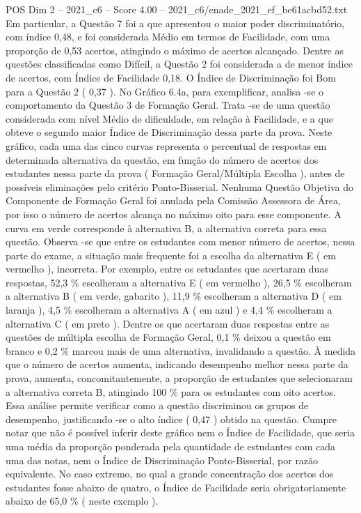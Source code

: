 \begin{textsample}{POS Dim 2 – 2021\_c6 – Score 4.00 – 2021\_c6/enade\_2021\_ef\_be61acbd52.txt}
Em particular, a Questão 7 foi a que apresentou o maior poder discriminatório, com índice 0,48, e foi considerada Médio em termos de Facilidade, com uma proporção de 0,53 acertos, atingindo o máximo de acertos alcançado.
Dentre as questões classificadas como Difícil, a Questão 2 foi considerada a de menor índice de acertos, com Índice de Facilidade 0,18.
O Índice de Discriminação foi Bom para a Questão 2 ( 0,37 ).
No Gráfico 6.4a, para exemplificar, analisa -se o comportamento da Questão 3 de Formação Geral.
Trata -se de uma questão considerada com nível Médio de dificuldade, em relação à Facilidade, e a que obteve o segundo maior Índice de Discriminação dessa parte da prova.
Neste gráfico, cada uma das cinco curvas representa o percentual de respostas em determinada alternativa da questão, em função do número de acertos dos estudantes nessa parte da prova ( Formação Geral/Múltipla Escolha ), antes de possíveis eliminações pelo critério Ponto-Bisserial.
Nenhuma Questão Objetiva do Componente de Formação Geral foi anulada pela Comissão Assessora de Área, por isso o número de acertos alcança no máximo oito para esse componente.
A curva em verde corresponde à alternativa B, a alternativa correta para essa questão.
Observa -se que entre os estudantes com menor número de acertos, nessa parte do exame, a situação mais frequente foi a escolha da alternativa E ( em vermelho ), incorreta.
Por exemplo, entre os estudantes que acertaram duas respostas, 52,3 \% escolheram a alternativa E ( em vermelho ), 26,5 \% escolheram a alternativa B ( em verde, gabarito ), 11,9 \% escolheram a alternativa D ( em laranja ), 4,5 \% escolheram a alternativa A ( em azul ) e 4,4 \% escolheram a alternativa C ( em preto ).
Dentre os que acertaram duas respostas entre as questões de múltipla escolha de Formação Geral, 0,1 \% deixou a questão em branco e 0,2 \% marcou mais de uma alternativa, invalidando a questão.
À medida que o número de acertos aumenta, indicando desempenho melhor nessa parte da prova, aumenta, concomitantemente, a proporção de estudantes que selecionaram a alternativa correta B, atingindo 100 \% para os estudantes com oito acertos.
Essa análise permite verificar como a questão discriminou os grupos de desempenho, justificando -se o alto índice ( 0,47 ) obtido na questão.
Cumpre notar que não é possível inferir deste gráfico nem o Índice de Facilidade, que seria uma média da proporção ponderada pela quantidade de estudantes com cada uma das notas, nem o Índice de Discriminação Ponto-Bisserial, por razão equivalente.
No caso extremo, no qual a grande concentração dos acertos dos estudantes fosse abaixo de quatro, o Índice de Facilidade seria obrigatoriamente abaixo de 65,0 \% ( neste exemplo ).

\end{textsample}
